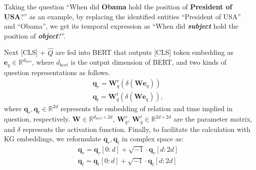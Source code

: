 \documentclass[11pt]{article}
\newcommand{\peng}[1]{{{\color{purple!60!blue}{[peng: #1]}}}}
\newcommand{\gt}[1]{{{\textcolor{cyan}{[gt: #1]}}}}
\begin{document}
Taking the question ``When did \textbf{Obama} hold the position of \textbf{President of USA}?'' as an example, by replacing the identified entities ``President of USA'' and ``Obama'', we get its temporal expression as ``When did \textbf{\textit{subject}} hold the position of \textbf{\textit{object}}?''.


Next [CLS] + $\hat{Q}$ are fed into BERT that outputs [CLS] token embedding as $\bm{e}_{q}\in \mathbb{R}^{d_{bert}}$, where $d_{bert}$ is the output dimension of BERT, and two kinds of question representations as follows.
\begin{align}
    \bm{q}_r = \bm{W}_{q}^{r}(\delta(\bm{W}\bm{e}_{q}))\\
    \bm{q}_t = \bm{W}_{q}^{t}(\delta(\bm{W}\bm{e}_{q})),
\end{align}
where $\bm{q}_r,  \bm{q}_t \in \mathbb{R}^{2d}$ represents the embedding of relation and time implied in question, respectively. $\bm{W}\in {\mathbb{R}^{d_{bert}\times 2d}}$, $\bm{W}_{q}^{r}$, $\bm{W}_{q}^{t} \in \mathbb{R}^{ 2d \times 2d}$ are the parameter matrix, and $\delta$ represents the activation function. Finally, to facilitate the calculation with KG embeddings, we reformulate $\bm{q}_r, \bm{q}_t$ in complex space as:
\begin{align}
    \bm{q}_r = \bm{q}_r[0:d] + \sqrt{-1} \cdot \bm{q}_r[d:2d]\\
    \bm{q}_t = \bm{q}_t[0:d] + \sqrt{-1} \cdot \bm{q}_t[d:2d]
\end{align}




\end{document}

